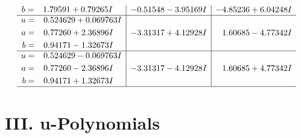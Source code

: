 \documentclass[1p]{elsarticle_modified}
\theoremstyle{definition}
\begin{document}
$$\begin{array}{c|c|c}
\begin{aligned}
b &= \phantom{-}1.79591 + 0.79265 I\end{aligned}
 & -0.51548 - 3.95169 I & -4.85236 + 6.04248 I \\ \hline\begin{aligned}
u &= \phantom{-}0.524629 + 0.069763 I \\
a &= \phantom{-}0.77260 + 2.36896 I \\
b &= \phantom{-}0.94171 - 1.32673 I\end{aligned}
 & -3.31317 + 4.12928 I & \phantom{-}1.60685 - 4.77342 I \\ \hline\begin{aligned}
u &= \phantom{-}0.524629 - 0.069763 I \\
a &= \phantom{-}0.77260 - 2.36896 I \\
b &= \phantom{-}0.94171 + 1.32673 I\end{aligned}
 & -3.31317 - 4.12928 I & \phantom{-}1.60685 + 4.77342 I\\
 \hline 
 \end{array}$$\newpage
\newpage\renewcommand{\arraystretch}{1}
\centering \section*{ III. u-Polynomials}
\end{document}
